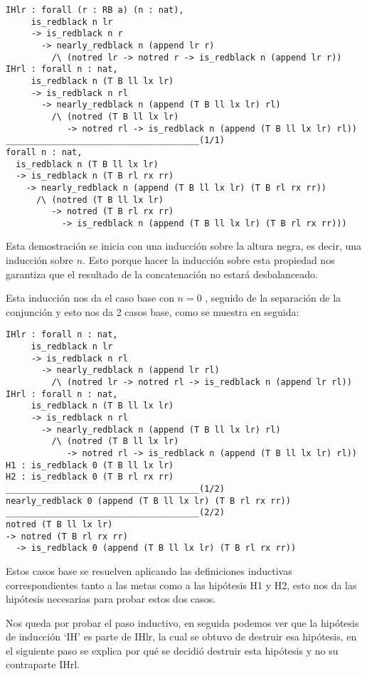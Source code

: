 \begin{verbatim}
IHlr : forall (r : RB a) (n : nat),
     is_redblack n lr
     -> is_redblack n r
       -> nearly_redblack n (append lr r)
         /\ (notred lr -> notred r -> is_redblack n (append lr r))
IHrl : forall n : nat,
     is_redblack n (T B ll lx lr)
     -> is_redblack n rl
       -> nearly_redblack n (append (T B ll lx lr) rl)
         /\ (notred (T B ll lx lr)
            -> notred rl -> is_redblack n (append (T B ll lx lr) rl))
______________________________________(1/1)
forall n : nat,
  is_redblack n (T B ll lx lr)
  -> is_redblack n (T B rl rx rr)
    -> nearly_redblack n (append (T B ll lx lr) (T B rl rx rr))
      /\ (notred (T B ll lx lr)
         -> notred (T B rl rx rr)
           -> is_redblack n (append (T B ll lx lr) (T B rl rx rr)))
\end{verbatim}

Esta demostraci\'on se inicia con una inducci\'on sobre la altura negra, es decir, una inducción 
sobre $n$. Esto porque hacer la inducción sobre esta propiedad nos garantiza que el resultado de la 
concatenación no estará desbalanceado.

Esta inducci\'on nos da el caso base con $n=0$
, seguido de la separaci\'on de la conjunci\'on y esto nos da 2 casos base, como se muestra en
seguida:

\begin{verbatim}
IHlr : forall n : nat,
     is_redblack n lr
     -> is_redblack n rl
       -> nearly_redblack n (append lr rl)
         /\ (notred lr -> notred rl -> is_redblack n (append lr rl))
IHrl : forall n : nat,
     is_redblack n (T B ll lx lr)
     -> is_redblack n rl
       -> nearly_redblack n (append (T B ll lx lr) rl)
         /\ (notred (T B ll lx lr)
            -> notred rl -> is_redblack n (append (T B ll lx lr) rl))
H1 : is_redblack 0 (T B ll lx lr)
H2 : is_redblack 0 (T B rl rx rr)
______________________________________(1/2)
nearly_redblack 0 (append (T B ll lx lr) (T B rl rx rr))
______________________________________(2/2)
notred (T B ll lx lr)
-> notred (T B rl rx rr)
  -> is_redblack 0 (append (T B ll lx lr) (T B rl rx rr))
\end{verbatim}

Estos casos base se resuelven aplicando las definiciones inductivas correspondientes tanto a las
metas como a las hip\'otesis H1 y H2, esto nos da las hipótesis necesarias para probar estos dos
casos.

Nos queda por probar el paso inductivo, en seguida podemos ver que la hipótesis de inducci\'on
`IH' es parte de IHlr, la cual se obtuvo de destruir esa hipótesis, en el siguiente paso se explica 
por qu\'e se decidió destruir esta hip\'otesis y no su contraparte IHrl.

